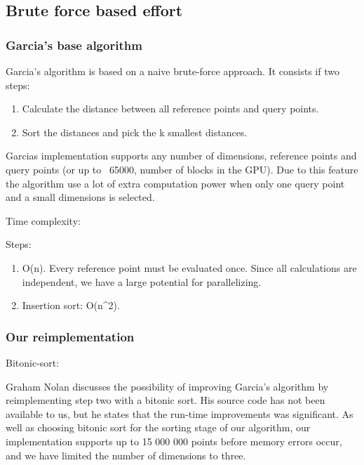 \subsection{Brute force based effort} %
\label{sub:brute_force_based_effort}

\subsubsection{Garcia's base algorithm} %
\label{ssub:garcias_base_algorithme}

Garcia's algorithm is based on a naive brute-force approach. It consists if two steps:
\begin{enumerate}
    \item Calculate the distance between all reference points and query points.
    \item Sort the distances and pick the k smallest distances.
\end{enumerate}

Garcias implementation supports any number of dimensions, reference points and query points (or up to ~65000, number of blocks in the GPU). Due to this feature the algorithm use a lot of extra computation power when only one query point and a small dimensions is selected.

Time complexity:

Steps:

\begin{enumerate}
    \item O(n). Every reference point must be evaluated once. Since all calculations are independent, we have a large potential for parallelizing.
    \item Insertion sort: O(n^2).
\end{enumerate}

\subsubsection{Our reimplementation} %
\label{ssub:our_reimplementation}

Bitonic-sort:

Graham Nolan discusses the possibility of improving Garcia's algorithm by reimplementing step two with a bitonic sort. His source code has not been available to us, but he states that the run-time improvements was significant. As well as choosing bitonic sort for the sorting stage of our algorithm, our implementation supports up to 15 000 000 points before memory errors occur, and we have limited the number of dimensions to three.

